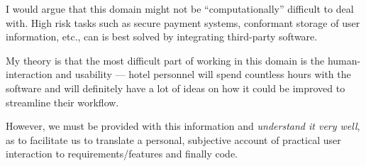 I would argue that this domain might not be ``computationally'' difficult to
deal with. High risk tasks such as secure payment systems, conformant storage
of user information, etc., can is best solved by integrating third-party
software.

My theory is that the most difficult part of working in this domain is the
human-interaction and usability --- hotel personnel will spend countless hours
with the software and will definitely have a lot of ideas on how it could be
improved to streamline their workflow.

However, we must be provided with this information and \emph{understand it very
well}, as to facilitate us to translate a personal, subjective account of
practical user interaction to requirements/features and finally code.




% 
% 
% 
% 
% 
% 
% 
% 
% 
% 
% 
% 
% 
% 
% 
% 
% 
% 
% 
% 
